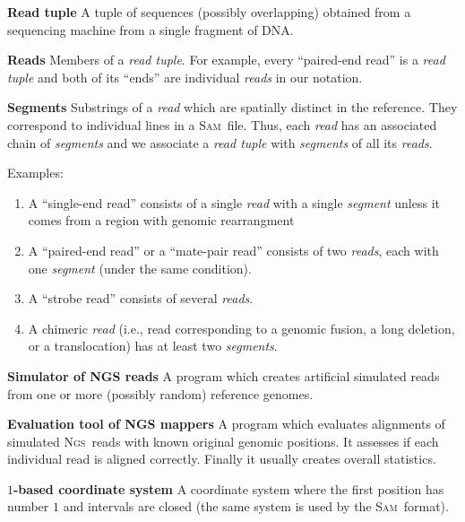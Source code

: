 \documentclass[10pt,a4paper]{article}
\newcommand{\SAM}{\textsc{Sam}}
\newcommand{\NGS}{\textsc{Ngs}}
\begin{document}
\begin{description}
	\item \textbf{Read tuple} 
	A tuple of sequences (possibly overlapping) obtained from a sequencing machine from a single fragment of DNA.

	\item \textbf{Reads} 
	Members of a {\em read tuple}. For example, every ``paired-end read'' is a {\em read tuple} and both of its ``ends'' are individual {\em reads} in our notation.

	\item \textbf{Segments}
	Substrings of a {\em read} which are spatially distinct in the reference. They correspond to individual lines in a \SAM\ file. Thus, each {\em read} has an
	associated chain of {\em segments} and we associate
	a {\em read tuple} with {\em segments} of all its {\em reads}.
		
	Examples:
	\begin{enumerate}[-]
		\item A ``single-end read'' consists of a single {\em read} with a single {\em segment}
		unless it comes from a region with genomic rearrangment
		\item A ``paired-end read'' or a ``mate-pair read'' consists
		of two {\em reads}, each with one {\em segment} (under the same condition).
		\item A ``strobe read'' consists of several {\em reads}.
		\item A chimeric {\em read} (i.e., read corresponding to a genomic fusion, a long deletion, or a translocation) has at least two {\em segments}.
	\end{enumerate}

	

	\item \textbf{Simulator of NGS reads}
	A program which creates artificial simulated reads from one
	or more (possibly random) reference genomes.
	
		
	\item \textbf{Evaluation tool of NGS mappers} 
	A program which evaluates alignments of simulated \NGS\ reads with known original
	genomic positions. It assesses if each individual read is aligned correctly. 	Finally it usually creates overall statistics.

	\item \textbf{$1$-based coordinate system}
	A coordinate system where the first position has number $1$
	and intervals are closed (the same system is used by the \SAM\ format).
\end{description}
\end{document}
